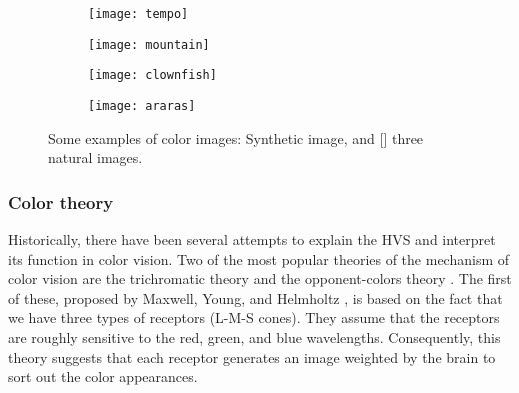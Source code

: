 \begin{figure}[!ht]
    \centering
    \begin{subfigure}[b]{0.24\textwidth}
        \texttt{[image: tempo]}
        \caption{}
        \label{fig:tempo}
    \end{subfigure}
    \begin{subfigure}[b]{0.24\textwidth}
        \texttt{[image: mountain]}
        \caption{}
        \label{fig:parrots}
    \end{subfigure} 
    \begin{subfigure}[b]{0.24\textwidth}
        \texttt{[image: clownfish]}
        \caption{}
        \label{fig:clownfish}
    \end{subfigure}
    \begin{subfigure}[b]{0.24\textwidth}
        \texttt{[image: araras]}
        \caption{}
        \label{fig:mountains}
    \end{subfigure}
                  
    \caption{Some examples of color images:  Synthetic image, and [] three natural images.}\label{fig:color_images}    
\end{figure}


\subsubsection{Color theory}
Historically, there have been several attempts to explain the HVS and interpret its function in color vision. Two of the most popular theories of the mechanism of color vision are the trichromatic theory and the opponent-colors theory \citep{Fairchild:Book:2005}. The first of these, proposed by Maxwell, Young, and Helmholtz \citep{Young:PTRSL:1802, VonHelmholtz:Book:1867}, is based on the fact that we have three types of receptors (L-M-S cones). They assume that the receptors are roughly sensitive to the red, green, and blue wavelengths. Consequently, this theory suggests that each receptor generates an image weighted by the brain to sort out the color appearances.

